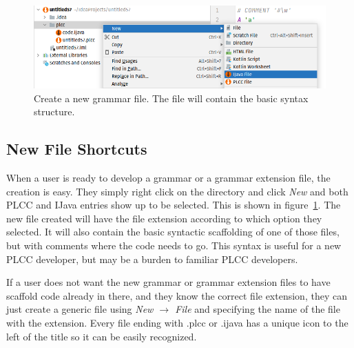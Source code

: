 \documentclass[conference, letterpaper]{IEEEtran}
\begin{document}
\begin{figure}[!t]
    \centering
    \includegraphics[width=6in]{new_PLCC_file_shortcut.png}
    \caption{Create a new grammar file. The file will contain the basic syntax structure.}
    \label{fig:new_file_shortcut}
\end{figure}
\subsection{New File Shortcuts}\label{subsec:new-plcc-file-shortcut}
When a user is ready to develop a grammar or a grammar extension file, the creation is easy.
They simply right click on the directory and click \textit{New} and both PLCC and IJava entries show up to be selected.
This is shown in figure~\ref{fig:new_file_shortcut}.
The new file created will have the file extension according to which option they selected.
It will also contain the basic syntactic scaffolding of one of those files, but with comments where the code needs to go.
This syntax is useful for a new PLCC developer, but may be a burden to familiar PLCC developers.

If a user does not want the new grammar or grammar extension files to have scaffold code already in there, and they know the correct file extension, they can just create a generic file using \textit{New $\rightarrow$ File} and specifying the name of the file with the extension.
Every file ending with .plcc or .ijava has a unique icon to the left of the title so it can be easily recognized.
\end{document}

